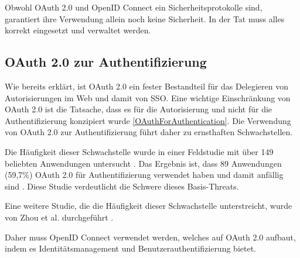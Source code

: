 Obwohl OAuth 2.0 und OpenID Connect ein Sicherheitsprotokolle sind, garantiert ihre Verwendung allein noch keine Sicherheit. In der Tat muss alles korrekt eingesetzt und verwaltet werden.

\subsection{OAuth 2.0 zur Authentifizierung}

Wie bereits erklärt, ist OAuth 2.0 ein fester Bestandteil für das Delegieren von Autorisierungen im Web und damit von SSO. Eine wichtige Einschränkung von OAuth 2.0 ist die Tatsache, dass es für die Autorisierung und nicht für die Authentifizierung konzipiert wurde \ref{OAuthForAuthentication}. Die Verwendung von OAuth 2.0 zur Authentifizierung führt daher zu ernsthaften Schwachstellen.

Die Häufigkeit dieser Schwachstelle wurde in einer Feldstudie mit über 149 beliebten Anwendungen untersucht \cite{chen2014oauth}. Das Ergebnis ist, dass 89 Anwendungen (59,7\%) OAuth 2.0 für Authentifizierung verwendet haben und damit anfällig sind \cite{chen2014oauth}. Diese Studie verdeutlicht die Schwere dieses Basis-Threats.

Eine weitere Studie, die die Häufigkeit dieser Schwachstelle unterstreicht, wurde von Zhou et al. durchgeführt \cite{184435}.


Daher muss OpenID Connect verwendet werden, welches auf OAuth 2.0 aufbaut, indem es Identitätsmanagement und Benutzerauthentifizierung bietet.

